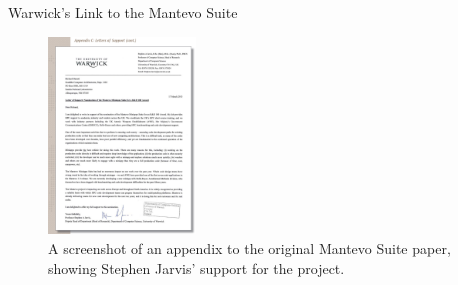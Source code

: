 \documentclass[10pt,aspectratio=169]{beamer}
\begin{document}
\begin{frame}{Warwick's Link to the Mantevo Suite}
    \begin{figure}[H]
        \includegraphics[width=0.35\textwidth]{images/warwick_mantevo_link.png}
        \caption{A screenshot of an appendix to the original Mantevo Suite paper, showing Stephen Jarvis' support for the project.}
        \label{fig:warwick_mantevo_link}
    \end{figure}
\end{frame}
\end{document}
